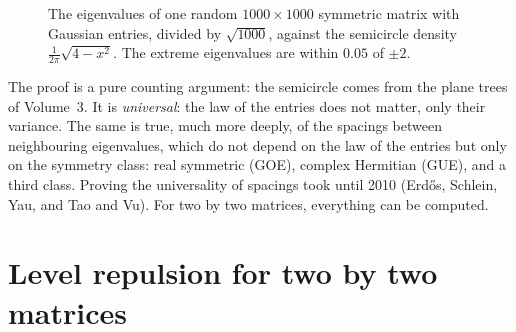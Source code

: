 \begin{figure}[ht]
\centering
{}
\caption{The eigenvalues of one random $1000\times1000$ symmetric matrix with Gaussian entries, divided by $\sqrt{1000}$, against the semicircle
density $\frac1{2\pi}\sqrt{4-x^2}$. The extreme eigenvalues are within $0.05$ of $\pm2$.}
\label{moments:fig:semicircle}
\end{figure}

The proof is a pure counting argument: the semicircle comes from the plane trees of Volume~3. It is \emph{universal}: the law of the entries does not
matter, only their variance. The same is true, much more deeply, of the spacings between neighbouring eigenvalues, which do not depend on the law of
the entries but only on the symmetry class: real symmetric (GOE), complex Hermitian (GUE), and a third class. Proving the universality of spacings
took until 2010 (Erd\H{o}s, Schlein, Yau, and Tao and Vu). For two by two matrices, everything can be computed.

\section{Level repulsion for two by two matrices}

